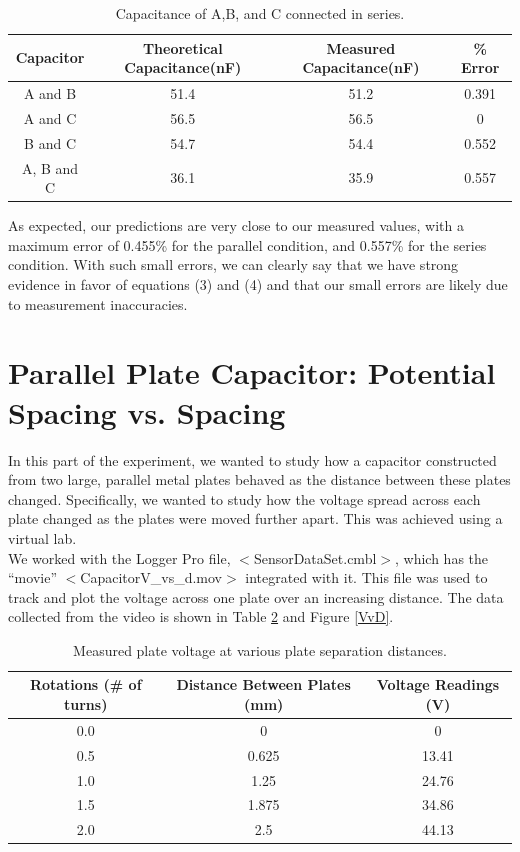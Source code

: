 \documentclass[oneside,12pt]{amsart}
\begin{document}
\begin{table}[h]
	\begin{tabular}{ |c|c|c|c|}
		\hline
		Capacitor & Theoretical Capacitance(nF)& Measured Capacitance(nF) &\% Error\\
		\hline
		A and B&51.4&51.2&0.391\\
		A and C&56.5&56.5&0\\
		B and C&54.7&54.4&0.552\\
		A, B and C&36.1&35.9&0.557\\
		\hline
	\end{tabular}
	\caption{Capacitance of A,B, and C connected in series.}
	\label{inSeries}
\end{table}
	
	As expected, our predictions are very close to our measured values, with a maximum error of 0.455\% for the parallel condition, and 0.557\% for the series condition. With such small errors, we can clearly say that we have strong evidence in favor of equations (3) and (4) and that our small errors are likely due to measurement inaccuracies. 

	
\section{Parallel Plate Capacitor: Potential Spacing vs. Spacing}
	In this part of the experiment, we wanted to study how a capacitor constructed from two large, parallel metal plates behaved as the distance between these plates changed. Specifically, we wanted to study how the voltage spread across each plate changed as the plates were moved further apart. This was achieved using a virtual lab.\\
	
	\indent We worked with the Logger Pro file, $<$SensorDataSet.cmbl$>$, which has the “movie” $<$CapacitorV\_vs\_d.mov$>$ integrated with it. This file was used to track and plot the voltage across one plate over an increasing distance. The data collected from the video is shown in Table \ref{Volt} and Figure \ref{VvD}.\\
	
	\begin{table}[h]
		\begin{tabular}{|c|c|c|}
			\hline
			Rotations (\# of turns) & Distance Between Plates (mm) & Voltage Readings (V)\\
			\hline
			0.0&0&0\\
			0.5&0.625&13.41\\
			1.0 &1.25&24.76\\
			1.5 &1.875&34.86\\
			2.0&2.5&44.13\\
			\hline
		\end{tabular}
		\caption{Measured plate voltage at various plate separation distances.} 
		\label{Volt}
	\end{table}
\end{document}
